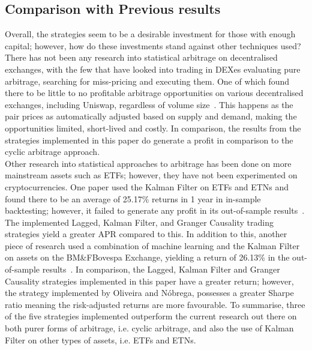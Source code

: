 \subsection{Comparison with Previous results}
Overall, the strategies seem to be a desirable investment for those with enough capital; however, how do these investments stand against other techniques used? There has not been any research into statistical arbitrage on decentralised exchanges, with the few that have looked into trading in DEXes evaluating pure arbitrage, searching for miss-pricing and executing them. One of which found there to be little to no profitable arbitrage opportunities on various decentralised exchanges, including Uniswap, regardless of volume size~\cite{boonpeam2021arbitrage}. This happens as the pair prices as automatically adjusted based on supply and demand, making the opportunities limited, short-lived and costly. In comparison, the results from the strategies implemented in this paper do generate a profit in comparison to the cyclic arbitrage approach.
\\[3mm]
Other research into statistical approaches to arbitrage has been done on more mainstream assets such as ETFs; however, they have not been experimented on cryptocurrencies. One paper used the Kalman Filter on ETFs and ETNs and found there to be an average of 25.17\% returns in 1 year in in-sample backtesting; however, it failed to generate any profit in its out-of-sample results~\cite{dempsey_market_2017}. The implemented Lagged, Kalman Filter, and Granger Causality trading strategies yield a greater APR compared to this. In addition to this, another piece of research used a combination of machine learning and the Kalman Filter on assets on the BM\&FBovespa Exchange, yielding a return of 26.13\% in the out-of-sample results~\cite{6974093}. In comparison, the Lagged, Kalman Filter and Granger Causality strategies implemented in this paper have a greater return; however, the strategy implemented by Oliveira and Nóbrega, possesses a greater Sharpe ratio meaning the risk-adjusted returns are more favourable. To summarise, three of the five strategies implemented outperform the current research out there on both purer forms of arbitrage, i.e. cyclic arbitrage, and also the use of Kalman Filter on other types of assets, i.e. ETFs and ETNs.
